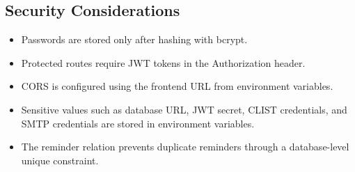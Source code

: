 \documentclass[12pt,a4paper]{report}
\begin{document}
\begin{normalsize}
\section{Security Considerations}

\begin{itemize}
    \item Passwords are stored only after hashing with bcrypt.
    \item Protected routes require JWT tokens in the Authorization header.
    \item CORS is configured using the frontend URL from environment variables.
    \item Sensitive values such as database URL, JWT secret, CLIST credentials, and SMTP credentials are stored in environment variables.
    \item The reminder relation prevents duplicate reminders through a database-level unique constraint.
\end{itemize}

\end{normalsize}
\end{document}
